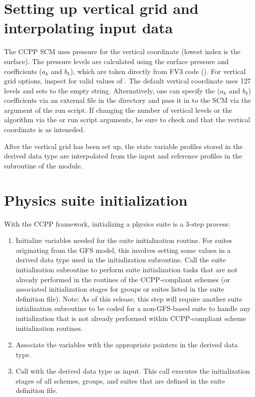 \section{Setting up vertical grid and interpolating input data}
The CCPP SCM uses pressure for the vertical coordinate (lowest index is the surface). The pressure levels are calculated using the surface pressure and coefficients ($a_k$ and $b_k$), which are taken directly from FV3 code (). For vertical grid options, inspect  for valid values of . The default vertical coordinate uses 127 levels and sets  to the empty string. Alternatively, one can specify the ($a_k$ and $b_k$) coefficients via an external file in the  directory and pass it in to the SCM via the  argument of the run script. If changing the number of vertical levels or the algorithm via the   or  run script arguments, be sure to check  and  that the vertical coordinate is as inteneded.

After the vertical grid has been set up, the state variable profiles stored in the  derived data type are interpolated from the input and reference profiles in the  subroutine of the  module.

\section{Physics suite initialization}
\label{section: physics init}
With the CCPP framework, initializing a physics suite is a 3-step process:
\begin{enumerate}
\item Initialize variables needed for the suite initialization routine. For suites originating from the GFS model, this involves setting some values in a derived data type used in the initialization subroutine. Call the suite initialization subroutine to perform suite initialization tasks that are not already performed in the  routines of the CCPP-compliant schemes (or associated initialization stages for groups or suites listed in the suite definition file). Note: As of this release, this step will require another suite intialization subroutine to be coded for a non-GFS-based suite to handle any initialization that is not already performed within CCPP-compliant scheme initialization routines.
\item Associate the  variables with the appropriate pointers in the  derived data type.
\item Call  with the  derived data type as input. This call executes the initialization stages of all schemes, groups, and suites that are defined in the suite definition file.
\end{enumerate}


